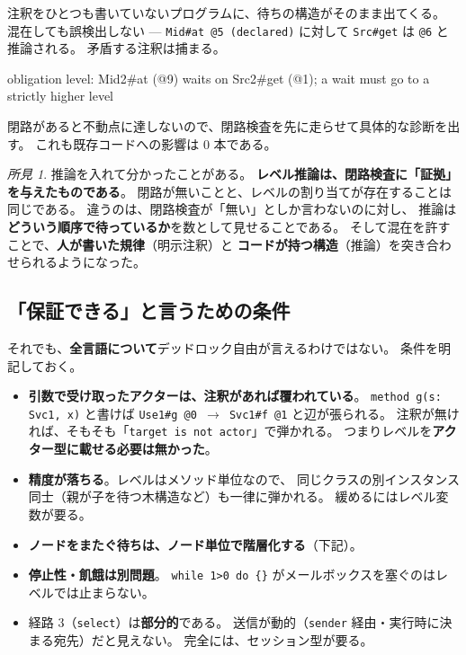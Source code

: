 \documentclass[11pt,a4paper]{ltjsarticle}
\theoremstyle{definition}
\theoremstyle{remark}
\newtheorem{finding}[theorem]{所見}
\begin{document}
注釈をひとつも書いていないプログラムに、待ちの構造がそのまま出てくる。
混在しても誤検出しない --- \texttt{Mid\#at @5 (declared)} に対して
\texttt{Src\#get} は \texttt{@6} と推論される。
矛盾する注釈は捕まる。

\begin{term}
 obligation level: Mid2#at (@9) waits on Src2#get (@1);
             a wait must go to a strictly higher level
\end{term}

閉路があると不動点に達しないので、閉路検査を先に走らせて具体的な診断を出す。
これも既存コードへの影響は 0 本である。

\begin{finding}
推論を入れて分かったことがある。
\textbf{レベル推論は、閉路検査に「証拠」を与えたものである}。
閉路が無いことと、レベルの割り当てが存在することは同じである。
違うのは、閉路検査が「無い」としか言わないのに対し、
推論は\textbf{どういう順序で待っているか}を数として見せることである。
そして混在を許すことで、\textbf{人が書いた規律}（明示注釈）と
\textbf{コードが持つ構造}（推論）を突き合わせられるようになった。
\end{finding}

\subsection{「保証できる」と言うための条件}


それでも、\textbf{全言語について}デッドロック自由が言えるわけではない。
条件を明記しておく。

\begin{itemize}
\item \textbf{引数で受け取ったアクターは、注釈があれば覆われている}。
      \texttt{method g(s: Svc1, x)} と書けば
      \texttt{Use1\#g @0 $\to$ Svc1\#f @1} と辺が張られる。
      注釈が無ければ、そもそも「\texttt{target is not actor}」で弾かれる。
      つまりレベルを\textbf{アクター型に載せる必要は無かった}。
\item \textbf{精度が落ちる}。レベルはメソッド単位なので、
      同じクラスの別インスタンス同士（親が子を待つ木構造など）も一律に弾かれる。
      緩めるにはレベル変数が要る。
\item \textbf{ノードをまたぐ待ちは、ノード単位で階層化する}（下記）。
\item \textbf{停止性・飢餓は別問題}。
      \texttt{while 1>0 do \{\}} がメールボックスを塞ぐのはレベルでは止まらない。
\item 経路 3（\texttt{select}）は\textbf{部分的}である。
      送信が動的（\texttt{sender} 経由・実行時に決まる宛先）だと見えない。
      完全には、セッション型が要る。
\end{itemize}
\end{document}
